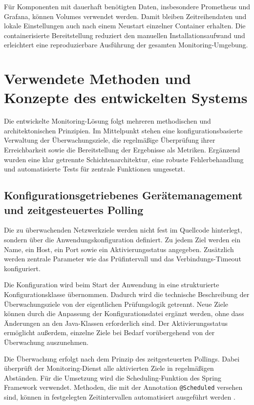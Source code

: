 Für Komponenten mit dauerhaft benötigten Daten, insbesondere Prometheus und Grafana, können Volumes verwendet werden. Damit bleiben Zeitreihendaten und lokale Einstellungen auch nach einem Neustart einzelner Container erhalten. Die containerisierte Bereitstellung reduziert den manuellen Installationsaufwand und erleichtert eine reproduzierbare Ausführung der gesamten Monitoring-Umgebung.

\section{Verwendete Methoden und Konzepte des entwickelten Systems}

Die entwickelte Monitoring-Lösung folgt mehreren methodischen und architektonischen Prinzipien. Im Mittelpunkt stehen eine konfigurationsbasierte Verwaltung der Überwachungsziele, die regelmäßige Überprüfung ihrer Erreichbarkeit sowie die Bereitstellung der Ergebnisse als Metriken. Ergänzend wurden eine klar getrennte Schichtenarchitektur, eine robuste Fehlerbehandlung und automatisierte Tests für zentrale Funktionen umgesetzt.

\subsection{Konfigurationsgetriebenes Gerätemanagement und zeitgesteuertes Polling}

Die zu überwachenden Netzwerkziele werden nicht fest im Quellcode hinterlegt, sondern über die Anwendungskonfiguration definiert. Zu jedem Ziel werden ein Name, ein Host, ein Port sowie ein Aktivierungsstatus angegeben. Zusätzlich werden zentrale Parameter wie das Prüfintervall und das Verbindungs-Timeout konfiguriert.

Die Konfiguration wird beim Start der Anwendung in eine strukturierte Konfigurationsklasse übernommen. Dadurch wird die technische Beschreibung der Überwachungsziele von der eigentlichen Prüfungslogik getrennt. Neue Ziele können durch die Anpassung der Konfigurationsdatei ergänzt werden, ohne dass Änderungen an den Java-Klassen erforderlich sind. Der Aktivierungsstatus ermöglicht außerdem, einzelne Ziele bei Bedarf vorübergehend von der Überwachung auszunehmen.

Die Überwachung erfolgt nach dem Prinzip des zeitgesteuerten Pollings. Dabei überprüft der Monitoring-Dienst alle aktivierten Ziele in regelmäßigen Abständen. Für die Umsetzung wird die Scheduling-Funktion des Spring Framework verwendet. Methoden, die mit der Annotation \texttt{@Scheduled} versehen sind, können in festgelegten Zeitintervallen automatisiert ausgeführt werden \cite{spring:scheduling}.

